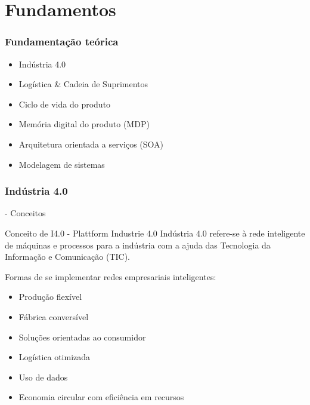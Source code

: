 \documentclass[10pt]{beamer}
\begin{document}
\section{Fundamentos}
\begin{frame}
	
	\frametitle{Fundamentação teórica}

	\begin{itemize}
		\item Indústria 4.0
		\item Logística \& Cadeia de Suprimentos
		\item Ciclo de vida do produto
		\item Memória digital do produto (MDP)
		\item Arquitetura orientada a serviços (SOA)
		\item Modelagem de sistemas
	\end{itemize}

\end{frame}
\begin{frame}
	
	\frametitle{Indústria 4.0} - Conceitos
	
	\begin{block}{Conceito de I4.0 - Plattform Industrie 4.0 }
		Indústria 4.0 refere-se à rede inteligente de máquinas e processos para a indústria com a ajuda das Tecnologia da Informação e Comunicação (TIC).
	\end{block}

	Formas de se implementar redes empresariais inteligentes:
	
	\begin{itemize}
		\item Produção flexível
		\item Fábrica conversível
		\item Soluções orientadas ao consumidor
		\item Logística otimizada
		\item Uso de dados
		\item Economia circular com eficiência em recursos
	\end{itemize}
	
\end{frame}
\end{document}
